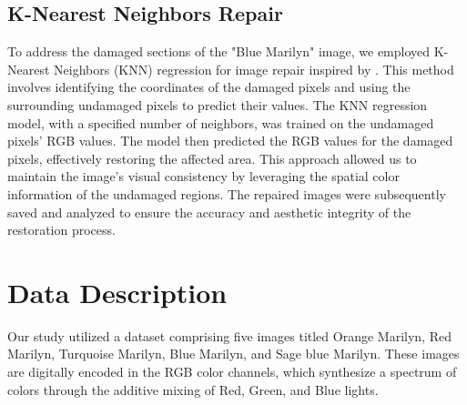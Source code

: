 \documentclass{article}
\begin{document}
\hypertarget{k-nearest-neighbors-repair}{%
\subsection{K-Nearest Neighbors
Repair}\label{k-nearest-neighbors-repair}}

To address the damaged sections of the "Blue Marilyn" image, we employed K-Nearest Neighbors (KNN) regression for image repair inspired by \citet{9879260}. This method involves identifying the coordinates of the damaged pixels and
using the surrounding undamaged pixels to predict their values. The KNN regression model, with a specified number of neighbors, was trained on
the undamaged pixels' RGB values. The model then predicted the RGB values for the damaged pixels, effectively restoring the affected area.
This approach allowed us to maintain the image's visual consistency by leveraging the spatial color information of the undamaged regions. The
repaired images were subsequently saved and analyzed to ensure the accuracy and aesthetic integrity of the restoration process.

\hypertarget{data-description}{%
\section{Data Description}\label{data-description}}

Our study utilized a dataset comprising five images titled Orange
Marilyn, Red Marilyn, Turquoise Marilyn, Blue Marilyn, and Sage blue
Marilyn. These images are digitally encoded in the RGB color channels,
which synthesize a spectrum of colors through the additive mixing of
Red, Green, and Blue lights. 
\end{document}
